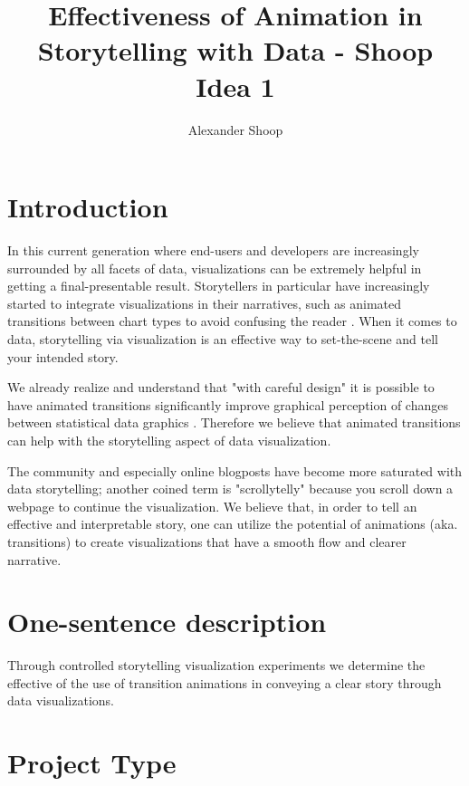 \documentclass{proc}
\begin{document}
\title{Effectiveness of Animation in Storytelling with Data  - Shoop Idea 1}

\author{Alexander Shoop}

\maketitle

\section{Introduction}

In this current generation where end-users and developers are increasingly surrounded by all facets of data, visualizations can be extremely helpful in getting a final-presentable result. Storytellers in particular have increasingly started to integrate visualizations in their narratives, such as animated transitions between chart types to avoid confusing the reader \cite{segelNarrative}. When it comes to data, storytelling via visualization is an effective way to set-the-scene and tell your intended story.

We already realize and understand that "with careful design" it is possible to have animated transitions significantly improve graphical perception of changes between statistical data graphics \cite{heerAnimated}. Therefore we believe that animated transitions can help with the storytelling aspect of data visualization. 

The community and especially online blogposts have become more saturated with data storytelling; another coined term is "scrollytelly" because you scroll down a webpage to continue the visualization. We believe that, in order to tell an effective and interpretable story, one can utilize the potential of animations (aka. transitions) to create visualizations that have a smooth flow and clearer narrative.

\section{One-sentence description}

Through controlled storytelling visualization experiments we determine the effective of the use of transition animations in conveying a clear story through data visualizations.

\section{Project Type}
\end{document}
